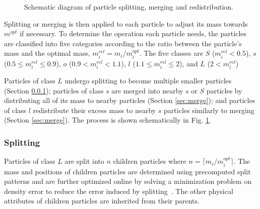 \documentclass[VANCOUVER,STIX1COL]{WileyNJD-v2}
\begin{document}
\begin{figure}[b]
    \centering
    \vspace{-0.7\baselineskip}
    \caption{Schematic diagram of particle splitting, merging and redistribution.}
    \label{fig:split_schem}
\end{figure}

Splitting or merging is then applied to each particle to adjust its mass towards $m^{opt}$ if necessary. To determine the operation each particle needs, the particles are classified into five categories according to the ratio between the particle's mass and the optimal mass, $m_i^{rel} = m_i / m_i^{opt}$. The five classes are $S$ ($m_i^{rel} < 0.5$), $s$ ($0.5 \leq m_i^{rel} \leq 0.9$), $o$ ($0.9 < m_i^{rel} < 1.1$), $l$ ($1.1 \leq m_i^{rel} \leq 2$), and $L$ ($2 < m_i^{rel}$)

Particles of class $L$ undergo splitting to become multiple smaller particles (Section \ref{sec:split}); particles of class $s$  are merged into nearby $s$ or $S$ particles by distributing all of its mass to nearby particles (Section \ref{sec:merge}); and particles of class $l$ redistribute their excess mass to nearby $s$ particles similarly to merging (Section \ref{sec:merge}). The process is shown schematically in Fig. \ref{fig:split_schem}.

\subsubsection{Splitting}
\label{sec:split}
Particles of class $L$ are split into $n$ children particles where $n = \lceil m_i / m_i^{opt} \rceil$. The mass and positions of children particles are determined using precomputed split patterns and are further optimized online by solving a minimization problem on density error to reduce the error induced by splitting~\cite{Winchenbach21}. The other physical attributes of children particles are inherited from their parents.
\end{document}
